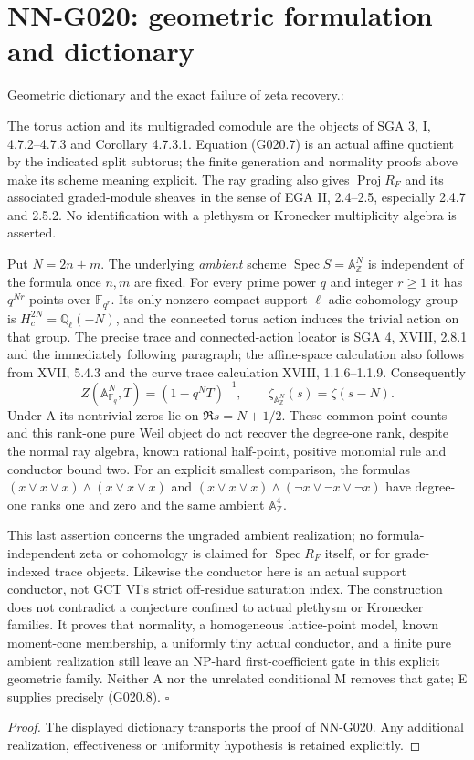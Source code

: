 \section{NN-G020: geometric formulation and dictionary}
\begin{geometricstatement}[NN-G020]
Geometric dictionary and the exact failure of zeta recovery.:

The torus action and its multigraded comodule are the objects of
SGA 3, I, 4.7.2--4.7.3 and Corollary 4.7.3.1. Equation (G020.7)
is an actual affine quotient by the indicated split subtorus;
the finite generation and normality proofs above make its scheme
meaning explicit. The ray grading also gives $\operatorname{Proj}R_F$
and its associated graded-module sheaves in the sense of EGA II,
2.4--2.5, especially 2.4.7 and 2.5.2. No identification with a
plethysm or Kronecker multiplicity algebra is asserted.

Put $N=2n+m$. The underlying \emph{ambient} scheme
$\operatorname{Spec}S=\mathbb A^N_{\mathbb Z}$ is independent of
the formula once $n,m$ are fixed. For every prime power $q$ and
integer $r\geq1$ it has $q^{Nr}$ points over $\mathbb F_{q^r}$.
Its only nonzero compact-support $\ell$-adic cohomology group
is $H_c^{2N}=\mathbb Q_\ell(-N)$, and the connected torus action
induces the trivial action on that group. The precise trace and
connected-action locator is SGA 4, XVIII, 2.8.1 and the immediately
following paragraph; the affine-space calculation also follows
from XVII, 5.4.3 and the curve trace calculation XVIII, 1.1.6--1.1.9.
Consequently
\[
 Z(\mathbb A^N_{\mathbb F_q},T)=(1-q^NT)^{-1},\qquad
 \zeta_{\mathbb A^N_{\mathbb Z}}(s)=\zeta(s-N).
 \tag{G020.9}
\]
Under A its nontrivial zeros lie on $\Re s=N+1/2$. These common
point counts and this rank-one pure Weil object do not recover
the degree-one rank, despite the normal ray algebra, known rational
half-point, positive monomial rule and conductor bound two.
For an explicit smallest comparison, the formulas
$(x\vee x\vee x)\wedge(x\vee x\vee x)$ and
$(x\vee x\vee x)\wedge(\neg x\vee\neg x\vee\neg x)$
have degree-one ranks one and zero and the same ambient
$\mathbb A^4_{\mathbb Z}$.

This last assertion concerns the ungraded ambient realization;
no formula-independent zeta or cohomology is claimed for
$\operatorname{Spec}R_F$ itself, or for grade-indexed trace objects.
Likewise the conductor here is an actual support conductor,
not GCT VI's strict off-residue saturation index. The construction
does not contradict a conjecture confined to actual plethysm or
Kronecker families. It proves that normality, a homogeneous
lattice-point model, known moment-cone membership, a uniformly
tiny actual conductor, and a finite pure ambient realization
still leave an NP-hard first-coefficient gate in this explicit
geometric family. Neither A nor the unrelated conditional M
removes that gate; E supplies precisely (G020.8).
\hfill$\square$


\end{geometricstatement}
\begin{proof} The displayed dictionary transports the proof of NN-G020. Any additional realization, effectiveness or uniformity hypothesis is retained explicitly.\end{proof}


